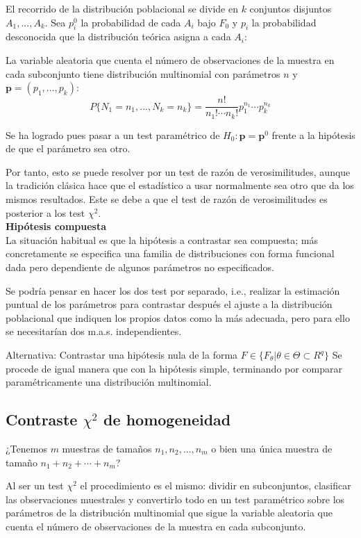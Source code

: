 \documentclass[a4paper,12pt]{article}
\begin{document}
El recorrido de la distribución poblacional se divide en $k$ conjuntos disjuntos $A_1,...,A_k$. Sea $p^0_i$ la probabilidad de cada $A_i$ bajo $F_0$ y $p_i$ la probabilidad desconocida que la distribución teórica asigna a cada $A_i$:

La variable aleatoria que cuenta el número de observaciones de la muestra en cada subconjunto tiene distribución multinomial con parámetros $n$ y $\textbf{p}= (p_1,...,p_k)$:
$$P\{N_1=n_1,...,N_k=n_k\}= \frac{n!}{n_1!\cdots n_k!} p^{n_1}_1\cdots p^{n_k}_k$$

Se ha logrado pues pasar a un test paramétrico de $H_0 :   \textbf{p} = \textbf{p}^0$ frente a la hipótesis de que el parámetro sea otro.

Por tanto, esto se puede resolver por un test de razón de verosimilitudes, aunque la tradición clásica hace que el estadístico a usar normalmente sea otro que da los mismos resultados. Este se debe a que el test de razón de verosimilitudes es posterior a los test $\chi^2$.
\\

\textbf{Hipótesis compuesta} \\
La situación habitual es que la hipótesis a contrastar sea compuesta; más concretamente se especifica una familia de distribuciones con forma funcional dada pero dependiente de algunos parámetros no especificados.

Se podría pensar en hacer los dos test por separado, i.e., realizar la estimación puntual de los parámetros para contrastar después el ajuste a la distribución poblacional que indiquen los propios datos como la más adecuada, pero para ello se necesitarían dos m.a.s. independientes.

Alternativa: Contrastar una hipótesis nula de la forma $F \in \{F_\theta| \theta \in \Theta \subset R^q\}$
Se procede de igual manera que con la hipótesis simple, terminando por comparar paramétricamente una distribución multinomial.

\subsection{Contraste $\chi^2$ de homogeneidad}
¿Tenemos $m$ muestras de tamaños $n_1, n_2,...,n_m$ o bien una única muestra de tamaño $n_1+n_2+\cdots + n_m$?

Al ser un test $\chi ^2$ el procedimiento es el mismo: dividir en subconjuntos, clasificar las observaciones muestrales y convertirlo todo en un test paramétrico sobre los parámetros de la distribución multinomial que sigue la variable aleatoria que cuenta el número de observaciones de la muestra en cada subconjunto. 
\end{document}
